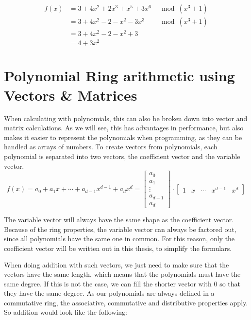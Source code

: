 \begin{align*}
  f(x) & = 3+4x^2+2x^3+x^5+3x^6 & \mod (x^3+1) \\
       & = 3+4x^2-2-x^2-3x^3    & \mod (x^3+1) \\
       & = 3+4x^2-2-x^2+3                      \\
       & = 4+3x^2
\end{align*}

\section{Polynomial Ring arithmetic using Vectors \& Matrices}
\label{sec:PolyMulMath}

When calculating with polynomials, this can also be broken down into vector and matrix calculations. As we will see, this has advantages in performance, but also makes it easier to represent the polynomials when programming, as they can be handled as arrays of numbers. To create vectors from polynomials, each polynomial is separated into two vectors, the coefficient vector and the variable vector.
$$
  f(x) = a_0+ a_1x+\cdots+ a_{d-1}x^{d-1}+a_dx^d =
  \begin{bmatrix}a_0\\a_1\\ \vdots \\a_{d-1}\\a_d \end{bmatrix}
  \cdot
  \begin{bmatrix}1 & x & \cdots & x^{d-1} &  x^d \end{bmatrix}
$$

The variable vector will always have the same shape as the coefficient vector. Because of the ring properties, the variable vector can always be factored out, since all polynomials have the same one in common. For this reason, only the coefficient vector will be written out in this thesis, to simplify the formulars.

When doing addition with such vectors, we just need to make sure that the vectors have the same length, which means that the polynomials must have the same degree. If this is not the case, we can fill the shorter vector with 0 so that they have the same degree. As our polynomials are always defined in a commutative  ring, the associative, commutative and distributive properties apply. So addition would look like the following:

